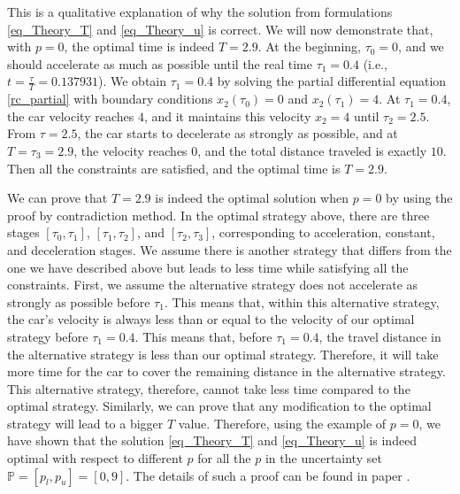 \documentclass  [
  paper    = a4,
  BCOR     = 10mm,
  twoside,
  fontsize = 12pt,
  fleqn,
  toc      = bibnumbered,
  toc      = listofnumbered,
  numbers  = noendperiod,
  headings = normal,
  listof   = leveldown,
  version  = 3.03
]                                       {scrreprt}
\newcommand{\<}{\langle}
\renewcommand{\>}{\rangle}
\begin{document}
This is a qualitative explanation of why the solution from formulations \ref{eq_Theory_T} and \ref{eq_Theory_u} is correct. We will now demonstrate that, with $p=0$, the optimal time is indeed $T=2.9$. At the beginning, $\tau_0 = 0$, and we should accelerate as much as possible until the real time $\tau_1=0.4$ (i.e., $t= \frac{\tau}{T} = 0.137931$). We obtain $\tau_1=0.4$ by solving the partial differential equation \ref{rc_partial} with boundary conditions $x_2(\tau_0)=0$ and $x_2(\tau_1)=4$. At $\tau_1=0.4$, the car velocity reaches $4$, and it maintains this velocity $x_2=4$ until $\tau_2=2.5$. From $\tau=2.5$, the car starts to decelerate as strongly as possible, and at $T=\tau_3=2.9$, the velocity reaches $0$, and the total distance traveled is exactly $10$. Then all the constraints are satisfied, and the optimal time is $T=2.9$.

We can prove that $T=2.9$ is indeed the optimal solution when $p=0$ by using the proof by contradiction method. In the optimal strategy above, there are three stages $[\tau_0, \tau_1]$, $[\tau_1, \tau_2]$, and $[\tau_2, \tau_3]$, corresponding to acceleration, constant, and deceleration stages. We assume there is another strategy that differs from the one we have described above but leads to less time while satisfying all the constraints. First, we assume the alternative strategy does not accelerate as strongly as possible before $\tau_1$. This means that, within this alternative strategy, the car's velocity is always less than or equal to the velocity of our optimal strategy before $\tau_1=0.4$. This means that, before $\tau_1=0.4$, the travel distance in the alternative strategy is less than our optimal strategy. Therefore, it will take more time for the car to cover the remaining distance in the alternative strategy. This alternative strategy, therefore, cannot take less time compared to the optimal strategy. Similarly, we can prove that any modification to the optimal strategy will lead to a bigger $T$ value. Therefore, using the example of $p=0$, we have shown that the solution \ref{eq_Theory_T} and \ref{eq_Theory_u} is indeed optimal with respect to different $p$ for all the $p$ in the uncertainty set $ \mathbb{P}=[p_l, p_u] =[0,9]$. The details of such a proof can be found in paper \cite{MatSch22}.
\end{document}
